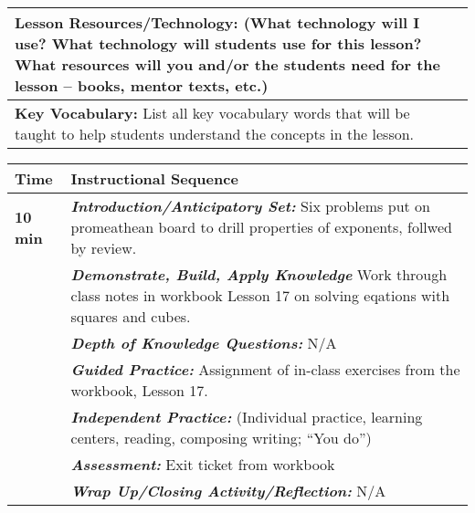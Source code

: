 \begin{tabularx}{\textwidth}{|X|X|}
      \textbf{Lesson Resources/Technology: } {\tiny (What
        technology will I use? What technology will students
        use for this lesson? What resources will you and/or the
        students need for the lesson – books, mentor texts,
        etc.)} \\ \hline
      
      \textbf{Key Vocabulary:} {\tiny List all key vocabulary
        words that will be taught to help students understand
        the concepts in the lesson.} \\ \hline
\end{tabularx}

\pagebreak

\begin{tabularx}{\textwidth}{|p{0.5in}|X|}
  \hline
  
  \centerline{\textbf{\large Time}}
  &
  \textbf{\large Instructional Sequence} \\
  \hline
  
  \textbf{10 min} & \textbf{\em Introduction/Anticipatory Set:}  Six
  problems put on promeathean board to drill properties of exponents,
  follwed by review. \\
  \hline
  
  \textbf{} & \textbf{\em Demonstrate, Build, Apply Knowledge}  Work
  through class notes in workbook Lesson 17 on solving eqations with
  squares and cubes.  \\
  \hline
  
  \textbf{} & \textbf{\em Depth of Knowledge Questions:}  N/A \\
  \hline
  
  \textbf{} & \textbf{\em Guided Practice:} 
  Assignment of in-class exercises from the workbook, Lesson 17.  \\
  \hline
  
  \textbf{} & \textbf{\em Independent Practice:} {\tiny (Individual
    practice, learning centers, reading, composing writing; “You do”)} \\
  \hline
  
  \textbf{} &  \textbf{\em Assessment:} Exit ticket from workbook\\
  \hline

  \textbf{} &  \textbf{\em Wrap Up/Closing Activity/Reflection:} N/A \\
  \hline
  
\end{tabularx}

\vskip 6pt

